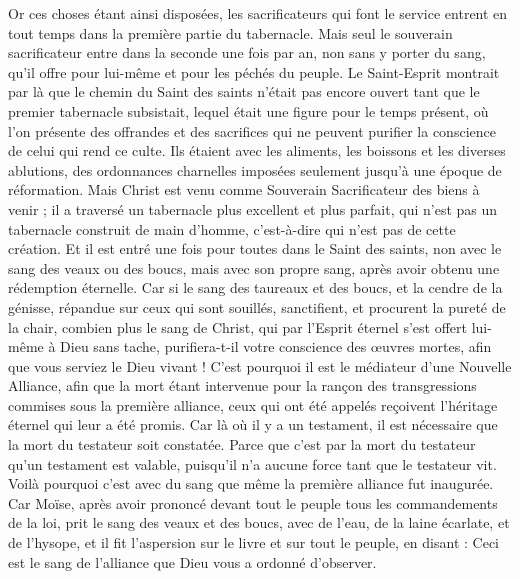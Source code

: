 \begin{multicols}{2}
Or ces choses étant ainsi disposées, les sacrificateurs qui font le service entrent en tout temps dans la première partie du tabernacle.
Mais seul le souverain sacrificateur entre dans la seconde une fois par an, non sans y porter du sang, qu’il offre pour lui-même et pour les péchés du peuple.
Le Saint-Esprit montrait par là que le chemin du Saint des saints n'était pas encore ouvert tant que le premier tabernacle subsistait,
lequel était une figure pour le temps présent, où l’on présente des offrandes et des sacrifices qui ne peuvent purifier la conscience de celui qui rend ce culte.
Ils étaient avec les aliments, les boissons et les diverses ablutions, des ordonnances charnelles imposées seulement jusqu’à une époque de réformation.
Mais Christ est venu comme Souverain Sacrificateur des biens à venir ; il a traversé un tabernacle plus excellent et plus parfait, qui n'est pas un tabernacle construit de main d’homme, c'est-à-dire qui n’est pas de cette création.
Et il est entré une fois pour toutes dans le Saint des saints, non avec le sang des veaux ou des boucs, mais avec son propre sang, après avoir obtenu une rédemption éternelle.
Car si le sang des taureaux et des boucs, et la cendre de la génisse, répandue sur ceux qui sont souillés, sanctifient, et procurent la pureté de la chair,
combien plus le sang de Christ, qui par l'Esprit éternel s'est offert lui-même à Dieu sans tache, purifiera-t-il votre conscience des œuvres mortes, afin que vous serviez le Dieu vivant !
C'est pourquoi il est le médiateur d’une Nouvelle Alliance, afin que la mort étant intervenue pour la rançon des transgressions commises sous la première alliance, ceux qui ont été appelés reçoivent l’héritage éternel qui leur a été promis.
Car là où il y a un testament, il est nécessaire que la mort du testateur soit constatée.
Parce que c'est par la mort du testateur qu'un testament est valable, puisqu’il n'a aucune force tant que le testateur vit.
Voilà pourquoi c’est avec du sang que même la première alliance fut inaugurée.
Car Moïse, après avoir prononcé devant tout le peuple tous les commandements de la loi, prit le sang des veaux et des boucs, avec de l'eau, de la laine écarlate, et de l'hysope, et il fit l’aspersion sur le livre et sur tout le peuple, en disant :
Ceci est le sang de l’alliance que Dieu vous a ordonné d'observer.

\end{multicols}
